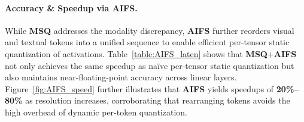 \paragraph{Accuracy \& Speedup via AIFS.}
While \textbf{MSQ} addresses the modality discrepancy, \textbf{AIFS} further reorders visual and textual tokens into a unified sequence to enable efficient per-tensor static quantization of activations. Table~\ref{table:AIFS_laten} shows that \textbf{MSQ}+\textbf{AIFS} not only achieves the same speedup as naïve per-tensor static quantization but also maintains near-floating-point accuracy across linear layers. Figure~\ref{fig:AIFS_speed} further illustrates that \textbf{AIFS} yields speedups of \textbf{20\%--80\%} as resolution increases, corroborating that rearranging tokens avoids the high overhead of dynamic per-token quantization.


\vspace{-2mm}
\begin{table}[h]
\caption{Comparative quantized results under different quantization settings on Qwen2-VL-7B~\citep{Qwen2VL}. ${\dagger}$ means re-implementation based on the official weight-only quantization setting with a group size of 128.}
\vspace{-2mm}
\label{table:weight-only}
\centering
\Huge
{}
\vspace{-6mm}
\end{table}

